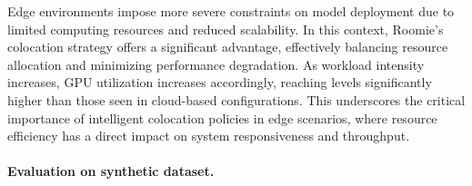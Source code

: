 Edge environments impose more severe constraints on model deployment due to limited computing resources and reduced scalability. In this context, Roomie's colocation strategy offers a significant advantage, effectively balancing resource allocation and minimizing performance degradation. As workload intensity increases, GPU utilization increases accordingly, reaching levels significantly higher than those seen in cloud-based configurations. This underscores the critical importance of intelligent colocation policies in edge scenarios, where resource efficiency has a direct impact on system responsiveness and throughput.

\paragraph{Evaluation on synthetic dataset.}

